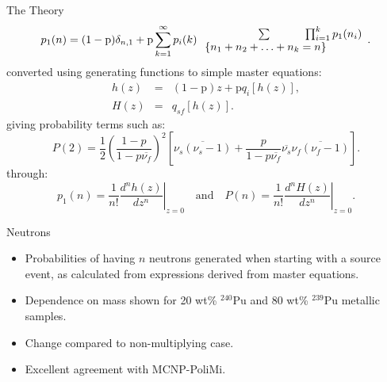 \documentclass[clock,style=horatio,paper=screen,blackslide,trans=Wipe,mode=present]{powerdot}
\begin{document}
\begin{wideslide}[toc=]{The Theory}
\vspace{-2mm}
\begin{equation} p_1(n)=(1-\mathrm{p})\delta_{n,1} +
\mathrm{p} \sum_{k=1}^{\infty} p_i(k)
\begin{array}{c}  \quad \quad \quad \quad \quad \sum \quad \quad \quad  \prod^k_{i=1} p_1(n_i) \cr
\{n_1+n_2+ \ldots + n_k=n\} \quad \quad \quad  \end{array}.
\end{equation}
converted using generating functions to simple master equations:
\vspace{-2mm}
\begin{eqnarray}
\label{eq:hz}
h(z)&=&(1-\mathrm{p})z+ \mathrm{p} q_i[h(z)], \\
H(z)&=&q_{sf}[h(z)].
\end{eqnarray}
giving probability terms such as: \vspace{-2mm}
\begin{equation}
 P(2)= \frac{1}{2} \left(\frac{1-p}{1-p\overline{\nu_f}}\right)^{2}
 \left[ \overline{\nu_s(\nu_s-1)} +
 \frac{p}{1-p\overline{\nu_f}} \overline{\nu_s} \overline{\nu_f(\nu_f-1)}\right].
\end{equation}\vspace{-2mm}
through:\vspace{-2mm}
\begin{equation}
\label{eq:probp} p_1(n) = \left.\frac{1}{n!}
\frac{d^{n}h(z)}{dz^{n}} \right|_{z=0} \quad \mbox{and} \quad P(n)
= \left.\frac{1}{n!} \frac{d^{n}H(z)}{dz^{n}} \right|_{z=0}.
\end{equation}
\end{wideslide}


\begin{wideslide}{Neutrons}
{\begin{itemize}
\item Probabilities of having $n$ neutrons generated when starting
    with a source event, as calculated from expressions derived
    from master equations.

\item Dependence on mass shown for 20 wt\% $^{240}$Pu and 80
    wt\% $^{239}$Pu  metallic samples.

\item Change compared to non-multiplying case.

\item Excellent agreement with MCNP-PoliMi.

\end{itemize}}
\end{wideslide}
\end{document}
